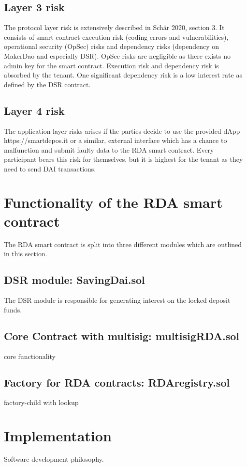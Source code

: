 \documentclass[12pt,a4paper,titlepage,oneside,english]{article}
\begin{document}
\subsection{Layer 3 risk}
The protocol layer risk is extensively described in Schär 2020, section 3. It consists of smart contract execution risk (coding errors and vulnerabilities), operational security (OpSec) risks and dependency risks (dependency on MakerDao and especially DSR). 
OpSec risks are negligible as there exists no admin key for the smart contract. Execution risk and dependency risk is absorbed by the tenant. One significant dependency risk is a low interest rate as defined by the DSR contract.

\subsection{Layer 4 risk}
The application layer risks arises if the parties decide to use the provided dApp https://smartdepos.it or a similar, external interface which has a chance to malfunction and submit faulty data to the RDA smart contract. Every participant bears this risk for themselves, but it is highest for the tenant as they need to send DAI transactions.



\section{Functionality of the RDA smart contract}
The RDA smart contract is split into three different modules which are outlined in this section.
\subsection{DSR module: SavingDai.sol}
The DSR module is responsible for generating interest on the locked deposit funds.
\subsection{Core Contract with multisig: multisigRDA.sol}
core functionality
\subsection{Factory for RDA contracts: RDAregistry.sol}
factory-child with lookup



\section{Implementation}
Software development philosophy.
\end{document}
